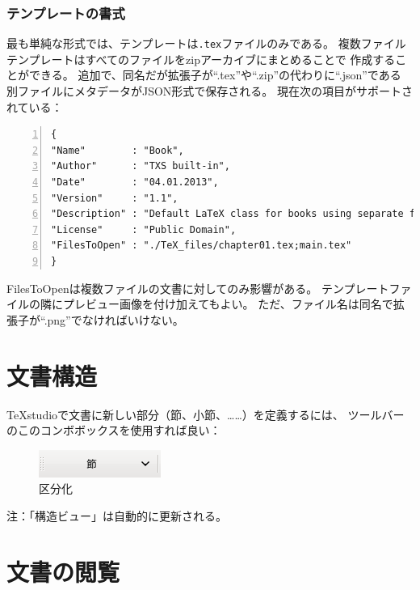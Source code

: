 \subsubsection{テンプレートの書式}\label{sec:templateformat}

最も単純な形式では、テンプレートは\texttt{.tex}ファイルのみである。
複数ファイルテンプレートはすべてのファイルをzipアーカイブにまとめることで
作成することができる。
追加で、同名だが拡張子が``.tex''や``.zip''の代わりに``.json''である
別ファイルにメタデータがJSON形式で保存される。
現在次の項目がサポートされている：

\begin{lstlisting}[frame=single,breaklines=true,numbers=left]
{
"Name"        : "Book",
"Author"      : "TXS built-in",
"Date"        : "04.01.2013",
"Version"     : "1.1",
"Description" : "Default LaTeX class for books using separate files for each chapter.",
"License"     : "Public Domain",
"FilesToOpen" : "./TeX_files/chapter01.tex;main.tex"
}
\end{lstlisting}

FilesToOpenは複数ファイルの文書に対してのみ影響がある。
テンプレートファイルの隣にプレビュー画像を付け加えてもよい。
ただ、ファイル名は同名で拡張子が``.png''でなければいけない。

\section{文書構造}

TeXstudioで文書に新しい部分（節、小節、……）を定義するには、
ツールバーのこのコンボボックスを使用すれば良い：

\begin{figure}[H]
  \centering
  \includegraphics{doc3.png}
  \caption{区分化}
\end{figure}


注：「構造ビュー」は自動的に更新される。


\section{文書の閲覧}

